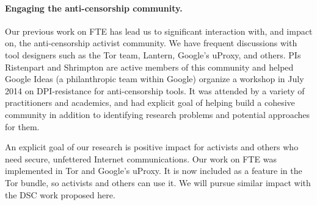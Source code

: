%



\paragraph{Engaging the anti-censorship community.} Our previous work on FTE has
lead us to significant interaction with, and impact on, the anti-censorship
activist community. We have frequent discussions with tool designers 
such as the Tor team, Lantern, Google's uProxy, and others. PIs Ristenpart and
Shrimpton are active members of this community and helped Google Ideas (a
philanthropic team within Google) organize a workshop in July 2014 on DPI-resistance
for anti-censorship tools. It was attended by a variety of practitioners
and academics, and had explicit goal of helping build a cohesive community in
addition to identifying research problems and potential approaches for them.

An explicit goal of our research is positive impact for activists and others who
need secure, unfettered Internet communications. Our work on FTE was
implemented in Tor and Google's uProxy. It is now included as a feature in
the Tor bundle, so activists and others can use it. 
We will pursue similar impact with the DSC work proposed here.



